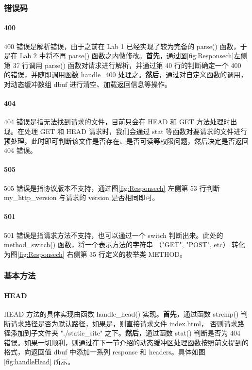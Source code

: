 \subsubsection{错误码}

\paragraph*{400}
400 错误是解析错误，由于之前在 Lab 1 已经实现了较为完备的 parse() 函数，于是在 Lab 2 中将不再 parse() 函数之内做修改。\textbf{首先}，通过图\ref{fig:Responsech}左侧 第 37 行调用 parse() 函数对请求进行解析，并通过第 40 行的判断确定一个 400 的错误，并随即调用函数 handle\_400 处理之。\textbf{然后}，通过对自定义函数的调用，对动态缓冲数组 dbuf 进行清空、加载返回信息等操作。

\paragraph*{404}
404 错误是指无法找到请求的文件，目前只会在 HEAD 和 GET 方法处理时出现。在处理 GET 和 HEAD 请求时，我们会通过 stat 等函数对要请求的文件进行预处理，此时即可判断该文件是否存在、是否可读等权限问题，然后决定是否返回 404 错误。

\paragraph*{505}
505 错误是指协议版本不支持，通过图\ref{fig:Responsech} 左侧第 53 行判断 my\_http\_version 与请求的 version 是否相同即可。

\paragraph*{501}

501 错误是指请求方法不支持，也可以通过一个 switch 判断出来。此处的 method\_switch() 函数，将一个表示方法的字符串 （"GET", "POST", etc） 转化为图\ref{fig:Responsech} 右侧第 35 行定义的枚举类 METHOD。


\subsubsection{基本方法}

\paragraph*{HEAD} HEAD 方法的具体实现由函数 handle\_head() 实现。\textbf{首先}，通过函数 strcmp() 判断请求路径是否为默认路径，如果是，则直接请求文件 index.html， 否则请求路径添加到子文件夹 "./static\_site" 之下。\textbf{然后}，通过函数 stat() 判断是否为 404 错误。如果一切顺利，则通过在下一节介绍的动态缓冲区处理函数按照前文提到的格式，向返回值 dbuf 中添加一系列 response 和 headers。具体如图\ref{fig:handleHead} 所示。


